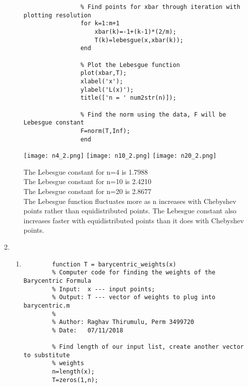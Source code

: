 \documentclass{article}
\begin{document}
\begin{enumerate}
\begin{enumerate}
\begin{lstlisting}
                % Find points for xbar through iteration with plotting resolution
                for k=1:m+1
                    xbar(k)=-1+(k-1)*(2/m);
                    T(k)=lebesgue(x,xbar(k));
                end

                % Plot the Lebesgue function
                plot(xbar,T);
                xlabel('x');
                ylabel('L(x)');
                title(['n = ' num2str(n)]);

                % Find the norm using the data, F will be Lebesgue constant
                F=norm(T,Inf);
                end
                \end{lstlisting}
                
                \begin{center}
                    \texttt{[image: n4\_2.png]}
                    \texttt{[image: n10\_2.png]}
                    \texttt{[image: n20\_2.png]}
                \end{center}
                
                The Lebesgue constant for n=4 is 1.7988 \\
                The Lebesgue constant for n=10 is 2.4210 \\
                The Lebesgue constant for n=20 is 2.8677 \\
                
                The Lebesgue function fluctuates more as n increases with Chebyshev points rather than equidistributed points. The Lebesgue constant also increases faster with equidistributed points than it does with Chebyshev points.
            
            
        \end{enumerate}
    \item %
    \begin{enumerate}
    \item 
        \begin{lstlisting}
        function T = barycentric_weights(x)
        % Computer code for finding the weights of the Barycentric Formula
        % Input:  x --- input points;
        % Output: T --- vector of weights to plug into barycentric.m
        %
        % Author: Raghav Thirumulu, Perm 3499720
        % Date:   07/11/2018

        % Find length of our input list, create another vector to substitute 
        % weights
        n=length(x);
        T=zeros(1,n);


\end{lstlisting}
\end{enumerate}
\end{enumerate}
\end{document}
